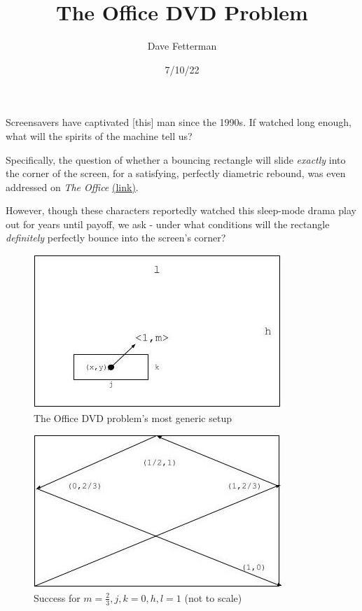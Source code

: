 \documentclass[11pt, oneside]{article} 	%
\title{The Office DVD Problem}
\author{Dave Fetterman}
\affil{Obviously Unemployed}
\date{7/10/22}
\begin{document}
\maketitle

Screensavers have captivated [this] man since the 1990s. If watched long enough, what will the spirits of the machine tell us?

Specifically, the question of whether a bouncing rectangle will slide \emph{exactly} into the corner of the screen, for a satisfying, perfectly diametric rebound, was even addressed on \emph{The Office}
\href{https://www.youtube.com/watch?v=QOtuX0jL85Y}{(link)}.

However, though these characters reportedly watched this sleep-mode drama play out for years until payoff, we ask - under what conditions will the rectangle \emph{definitely} perfectly bounce into the screen's corner?
 
\begin{figure}
\centering
\includegraphics[scale=.5]{setup}
\caption{The Office DVD problem's most generic setup}
\end{figure}


\begin{figure}[!htb]
\centering
\includegraphics[scale=.5]{problem1trajectory}
 \caption{Success for $m = \frac{2}{3}, j, k = 0, h, l = 1$ (not to scale)}
\end{figure}
\end{document}
